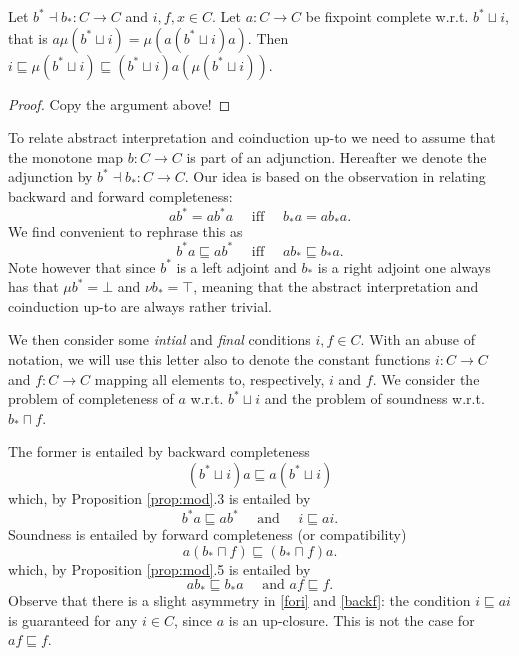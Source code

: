 \documentclass{llncs}
\begin{document}
\begin{proposition}
Let $b^* \dashv b_* \colon C \to C$ and $i,f,x\in C$. Let $a\colon C\to C$ be fixpoint complete w.r.t. $b^*\sqcup i$, that is $a\mu (b^*\sqcup i) = \mu(a(b^*\sqcup i)a)$. Then $i\sqsubseteq \mu(b^*\sqcup i) \sqsubseteq (b^*\sqcup i) a(\mu(b^*\sqcup i))$. 
%
\end{proposition}
\begin{proof}
Copy the argument above!
\end{proof}





To relate abstract interpretation and coinduction up-to we need to assume that the monotone map $b\colon C\to C$ is part of an adjunction.
Hereafter we denote the adjunction by $b^*\dashv b_* \colon C\to C$. Our idea is based on the observation in \cite{} relating backward and forward completeness:
$$ ab^* = ab^*a \quad \text{ iff } \quad b_*a = ab_* a \text{.}$$
We find convenient to rephrase this as
\begin{equation}\label{eq:bridge}
b^*a \sqsubseteq ab^*\quad \text{ iff } \quad ab_* \sqsubseteq b_*a \text{.}
\end{equation}
Note however that since $b^*$ is a left adjoint and $b_*$ is a right adjoint one always has that $\mu b^* = \bot$ and $\nu b_* = \top$, meaning that the abstract interpretation and coinduction up-to are always rather trivial.


We then consider some \emph{intial} and \emph{final} conditions $i,f\in C$. With an abuse of notation, we will use this letter also to denote the constant functions $i\colon C\to C$ and $f\colon C\to C$ mapping all elements to, respectively, $i$ and $f$.
We consider the problem of completeness of $a$ w.r.t. $b^*\sqcup i$ and the problem of soundness w.r.t. $b_*\sqcap f$.

The former is entailed by backward completeness
$$(b^* \sqcup i) a \sqsubseteq a (b^* \sqcup i)$$
which, by Proposition \ref{prop:mod}.3 is entailed by 
\begin{equation}\label{fori}
b^*a \sqsubseteq a b^*  \quad \text{ and } \quad i \sqsubseteq ai \text{.}\end{equation}
Soundness is entailed by forward completeness (or compatibility)
$$
a(b_*\sqcap f) \sqsubseteq (b_* \sqcap f) a \text{.}
$$
which, by Proposition \ref{prop:mod}.5 is entailed by 
\begin{equation}\label{backf}
ab_* \sqsubseteq b_*  a \quad \text{ and } af \sqsubseteq f \text{.}
\end{equation}
Observe that there is a slight asymmetry in \eqref{fori} and \eqref{backf}: the condition $i \sqsubseteq ai $ is guaranteed for any $i\in C$, since $a$ is an up-closure. This is not the case for $af \sqsubseteq f $.
\end{document}
